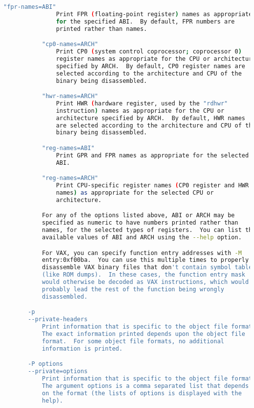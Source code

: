 {{\begin{lstlisting}[language=bash]
           "fpr-names=ABI"
               Print FPR (floating-point register) names as appropriate
               for the specified ABI.  By default, FPR numbers are
               printed rather than names.

           "cp0-names=ARCH"
               Print CP0 (system control coprocessor; coprocessor 0)
               register names as appropriate for the CPU or architecture
               specified by ARCH.  By default, CP0 register names are
               selected according to the architecture and CPU of the
               binary being disassembled.

           "hwr-names=ARCH"
               Print HWR (hardware register, used by the "rdhwr"
               instruction) names as appropriate for the CPU or
               architecture specified by ARCH.  By default, HWR names
               are selected according to the architecture and CPU of the
               binary being disassembled.

           "reg-names=ABI"
               Print GPR and FPR names as appropriate for the selected
               ABI.

           "reg-names=ARCH"
               Print CPU-specific register names (CP0 register and HWR
               names) as appropriate for the selected CPU or
               architecture.

           For any of the options listed above, ABI or ARCH may be
           specified as numeric to have numbers printed rather than
           names, for the selected types of registers.  You can list the
           available values of ABI and ARCH using the --help option.

           For VAX, you can specify function entry addresses with -M
           entry:0xf00ba.  You can use this multiple times to properly
           disassemble VAX binary files that don't contain symbol tables
           (like ROM dumps).  In these cases, the function entry mask
           would otherwise be decoded as VAX instructions, which would
           probably lead the rest of the function being wrongly
           disassembled.

       -p
       --private-headers
           Print information that is specific to the object file format.
           The exact information printed depends upon the object file
           format.  For some object file formats, no additional
           information is printed.

       -P options
       --private=options
           Print information that is specific to the object file format.
           The argument options is a comma separated list that depends
           on the format (the lists of options is displayed with the
           help).


\end{lstlisting}}}
